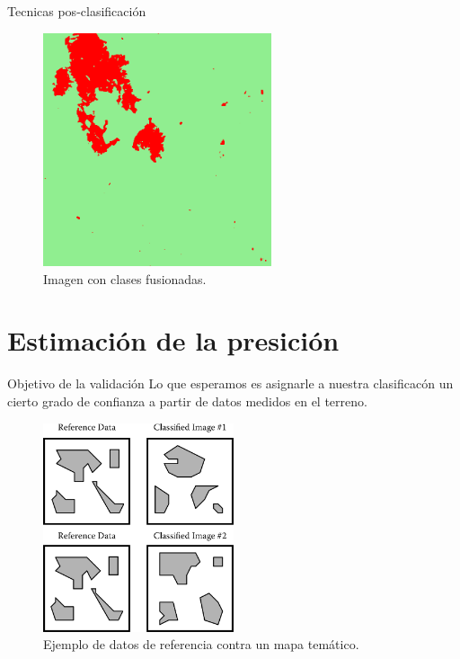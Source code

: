 \documentclass[handout]{beamer}
\begin{document}
\begin{frame}{Tecnicas pos-clasificación}
  \begin{figure}
    \includegraphics[width=0.6\textwidth]{imagenes/im_filter.png}
    \caption{Imagen con clases fusionadas.}
  \end{figure}
\end{frame}

\section{Estimación de la presición}
\begin{frame}{\subsecname}
\begin{block}{Objetivo de la validación}
  Lo que esperamos es asignarle a nuestra clasificacón un cierto grado de confianza a partir de datos medidos en el terreno.
\end{block}
\end{frame}

\begin{frame}{\subsecname}
  \begin{figure}
  \includegraphics[width=0.5\textwidth]{imagenes/valid.png}
  \caption{Ejemplo de datos de referencia contra un mapa temático.}
  \end{figure}
\end{frame}
\end{document}
